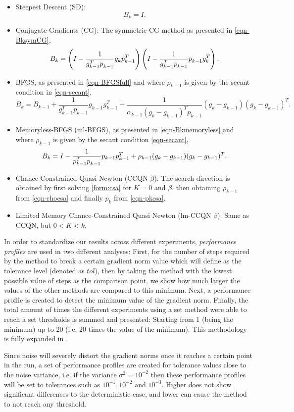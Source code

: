 \documentclass[11pt,twoside]{article}
\begin{document}
\begin{itemize}
	\item Steepest Descent (SD):
	\[B_k = I.\]
	\item Conjugate Gradients (CG): The symmetric CG method as presented in \eqref{eqn-BksymCG},
	\[B_k = \left( I - \frac{1}{g_{k-1}^T p_{k-1}\drop}g_k p_{k-1}^T\right) \left( I - \frac{1}{g_{k-1}^T p_{k-1}\drop} p_{k-1}\drop g_k^T\right).\]
	\item BFGS, as presented in \eqref{eqn-BFGSfull} and where $\rho_{k-1}$ is given by the secant condition in \eqref{eqn-secant},
	\[B_k = B_{k-1} + \frac1{g_{k-1}^T p_{k-1}} g_{k-1}g_{k-1}^T + \frac1{\alpha_{k-1}(g_k-g_{k-1})^Tp_{k-1}}(g_{k}-g_{k-1})(g_{k}-g_{k-1})^T.\]
	\item Memoryless-BFGS (ml-BFGS), as presented in \eqref{eqn-Bkmemoryless} and where $\rho_{k-1}$ is given by the secant condition \eqref{eqn-secant},
	\[B_k = I - \frac1{p_{k-1}^T p_{k-1}\drop} p_{k-1} p_{k-1}^T + \rho_{k-1} ( g_k - g_{k-1} ) ( g_k - g_{k-1})^T.\]
      \item Chance-Constrained Quasi Newton (CCQN $\beta$). The search
        direction is obtained by first solving \eqref{form:csa} for
        $K=0$ and $\beta$, then obtaining $\rho_{k-1}$ from \eqref{eqn-rhocsa}
        and finally $p_k$ from \eqref{eqn-pkcsa}.
	\item Limited Memory Chance-Constrained Quasi Newton
          (lm-CCQN $\beta$). Same as CCQN, but $0<K<k$.
\end{itemize}

In order to standardize our results across different experiments, \emph{performance profiles} are used in two different analyses: First, for the number of steps required by the method to break a certain gradient norm value which will define as the tolerance level (denoted as $tol$), then by taking the method with the lowest possible value of steps as the comparison point, we show how much larger the values of the other methods are compared to this minimum. Next, a performance profile is created to detect the minimum value of the gradient norm. Finally, the total amount of times the different experiments using a set method were able to reach a set thresholds is summed and presented: Starting from 1 (being the minimum) up to 20 (i.e. 20 times the value of the minimum). This methodology is fully expanded in \cite{EF21}.

Since noise will severely distort the gradient norms once it reaches a certain point in the run, a set of performance profiles are created for tolerance values close to the noise variance, i.e. if the variance $\sigma^2=10^{-2}$ then these performance profiles will be set to tolerances such as $10^{-1}, 10^{-2}$ and $10^{-3}$. Higher does not show significant differences to the deterministic case, and lower can cause the method to not reach any threshold.
\end{document}
